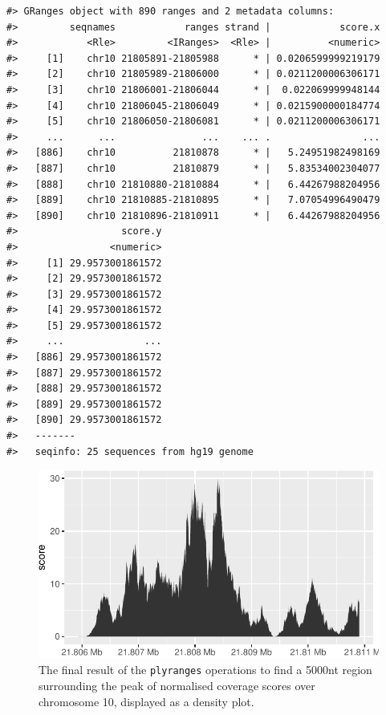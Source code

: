 \documentclass[]{article}
\begin{document}
\begin{verbatim}
#> GRanges object with 890 ranges and 2 metadata columns:
#>         seqnames            ranges strand |            score.x
#>            <Rle>         <IRanges>  <Rle> |          <numeric>
#>     [1]    chr10 21805891-21805988      * | 0.0206599999219179
#>     [2]    chr10 21805989-21806000      * | 0.0211200006306171
#>     [3]    chr10 21806001-21806044      * |  0.022069999948144
#>     [4]    chr10 21806045-21806049      * | 0.0215900000184774
#>     [5]    chr10 21806050-21806081      * | 0.0211200006306171
#>     ...      ...               ...    ... .                ...
#>   [886]    chr10          21810878      * |   5.24951982498169
#>   [887]    chr10          21810879      * |   5.83534002304077
#>   [888]    chr10 21810880-21810884      * |   6.44267988204956
#>   [889]    chr10 21810885-21810895      * |   7.07054996490479
#>   [890]    chr10 21810896-21810911      * |   6.44267988204956
#>                  score.y
#>                <numeric>
#>     [1] 29.9573001861572
#>     [2] 29.9573001861572
#>     [3] 29.9573001861572
#>     [4] 29.9573001861572
#>     [5] 29.9573001861572
#>     ...              ...
#>   [886] 29.9573001861572
#>   [887] 29.9573001861572
#>   [888] 29.9573001861572
#>   [889] 29.9573001861572
#>   [890] 29.9573001861572
#>   -------
#>   seqinfo: 25 sequences from hg19 genome
\end{verbatim}

\begin{figure}

{\centering \includegraphics{./diagrams/peak-viz-1} 

}

\caption{The final result of the \texttt{plyranges} operations to find a 5000nt region surrounding the peak of normalised coverage scores over chromosome 10, displayed as a density plot.}\label{fig:peak-viz}
\end{figure}
\end{document}
